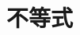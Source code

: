 \documentclass[../main.tex]{subfiles} %
\begin{document}
\chapter{不等式}





% 

% 

% 

% 

% 

% 

% 

% 
\end{document}
